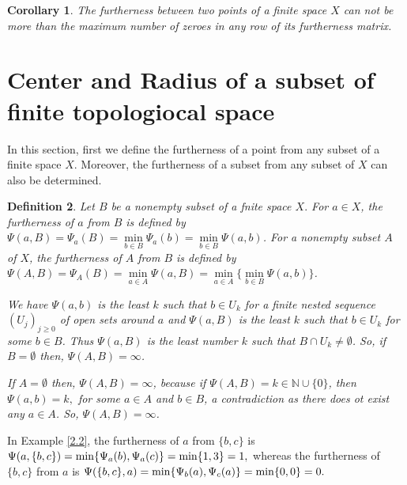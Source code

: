 \documentclass[12pt]{amsart}
\newtheorem{definition}{Definition}[section]
\newtheorem{corollary}[definition]{Corollary}
\begin{document}
\begin{corollary}
	The furtherness between two points of a finite space $X$ can not be more than the maximum number of zeroes in any row of its furtherness matrix.
\end{corollary}


	\section{\textbf{Center and Radius of a subset of finite topologiocal space}}
	
In this section, first we define the furtherness of a point  from any subset of a finite space $X$. Moreover, the furtherness of a subset from any  subset of $X$ can also be determined. 
	
	\begin{definition}
		Let $B$ be a nonempty subset of a fnite space $X.$ For $a\in X$,  the furtherness of $a$ from $B$ is defined by  $\Psi(a,B)=\Psi_{a}(B)=\min\limits_{b\in B}\Psi_{a}(b)=\min\limits_{b\in B}\Psi(a,b)$. For a nonempty subset $A$ of $X$, the furtherness of $A$ from $B$ is defined by  $\Psi(A,B)=\Psi_{A}(B)=\min\limits_{a\in A}\Psi(a,B)=\min\limits_{a\in A}\{\min\limits_{b\in B}\Psi(a,b)\}$.\par 
		{\normalfont We have $\Psi(a,b)$ is the least $k$ such that $b\in U_{k}$ for a finite nested sequence  $(U_j)_{j\geq0}$ of open sets around $a$ and $\Psi(a,B)$ is the  least $k$ such that $b\in U_{k}$ for some $b\in B$. Thus $\Psi(a,B)$ is the least number  $k$ such that $B\cap   U_{k}\neq\emptyset$. So, if $B= \emptyset$ then, $\Psi(A,B)=\infty$. \par
			If $A= \emptyset$ then, $\Psi(A,B)=\infty$, because if  $\Psi(A,B)=k\in \mathbb{N}\cup\{0\}$, then $\Psi(a,b)=k,$ for some $a\in A$ and $b\in B$, a contradiction as there does  ot exist any $a\in A$. So, $\Psi(A,B)=\infty$.
		}
		
		
	\end{definition}
	
	
	
	
	In Example \ref{2.2}, the furtherness of $a$ from $\{b,c\}$  is $\Psi(a,\{b,c\})=\min\{\Psi_{a}(b),\Psi_{a}(c)\}\\ =\min\{1,3\}=1,$ whereas the  furtherness of $\{b,c\}$ from  $a$ is $\Psi(\{b,c\},a)=\min\{\Psi_{b}(a),\\
	\Psi_{c}(a)\} =\min\{0,0\}=0.$\par 
	
\end{document}
